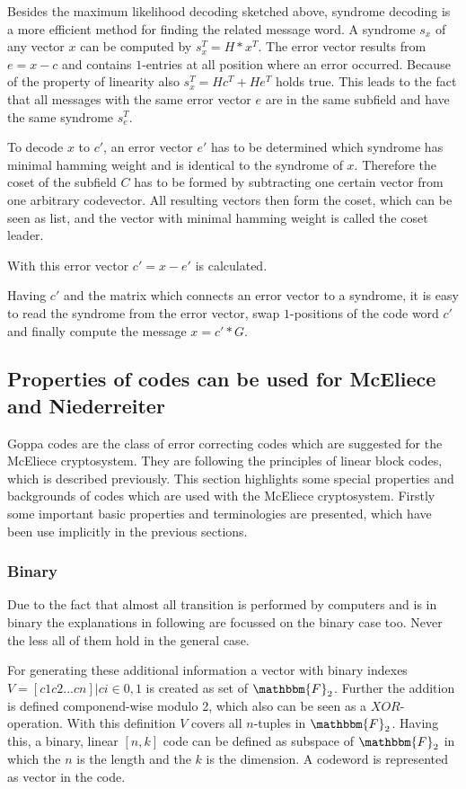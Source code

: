Besides the maximum likelihood decoding sketched above, syndrome decoding is a more efficient method for finding the related message word. A syndrome $s_{x}$ of any vector $x$ can be computed by $s_{x}^T = H * x^T$. The error vector results from $e = x - c$ and contains $1$-entries at all position where an error occurred. Because of the property of linearity also $s_{x}^T = Hc^T + He^T$ holds true. This leads to the fact that all messages with the same error vector $e$ are in the same subfield and have the same syndrome $s_e^T$. 

To decode $x$ to $c'$, an error vector $e'$ has to be determined which syndrome has minimal hamming weight and is identical to the syndrome of $x$. Therefore the coset of the subfield $C$ has to be formed by subtracting one certain vector from one arbitrary codevector. All resulting vectors then form the coset, which can be seen as list, and the vector with minimal hamming weight is called the coset leader. 

With this error vector  $c' = x - e'$ is calculated. 

Having $c'$ and the matrix which connects an error vector to a syndrome, it is easy to read the syndrome from the error vector, swap $1$-positions of the code word $c'$ and finally compute the message $x = c' * G$.\cite{greferath2009introduction}

\subsection*{Properties of codes can be used for McEliece and Niederreiter} %
Goppa codes are the class of error correcting codes which are suggested for the McEliece cryptosystem. They are following the principles of linear block codes, which is described previously.  This section highlights some special properties and backgrounds of codes which are used with the McEliece cryptosystem. Firstly some important basic properties and terminologies are presented, which have been use implicitly in the previous sections.


\subsubsection*{Binary} Due to the fact that almost all transition is performed by computers and is in binary the explanations in following are focussed on the binary case too. Never the less all of them hold in the general case. 

For generating these additional information a vector with binary indexes $V = {[c1 c2...cn] |ci \in {0, 1}}$ is created as set of $\mathbbm{F}_2$. Further the addition is defined componend-wise modulo 2, which also can be seen as a $XOR$-operation. With this definition $V$ covers all $n$-tuples in $\mathbbm{F}_2$. 
Having this, a binary, linear $[n, k]$ code can be defined as subspace of $\mathbbm{F}_2$ in which the $n$ is the length and the $k$ is the dimension. A codeword is represented as vector in the code.\cite{mceliece1978public}
 
